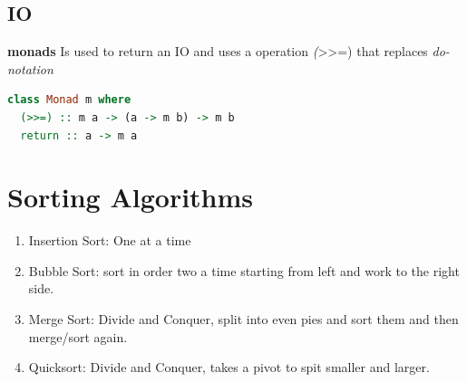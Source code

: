 \subsection{IO}
\textbf{monads}
Is used to return an IO and uses a operation \emph(>>=) that replaces \emph{do-notation}
\begin{lstlisting}[language=Haskell]
class Monad m where
  (>>=) :: m a -> (a -> m b) -> m b
  return :: a -> m a
\end{lstlisting}



\section{Sorting Algorithms}
\begin{enumerate}
\item Insertion Sort: One at a time
\item Bubble Sort: sort in order two a time starting from left and work to the right side.
\item Merge Sort: Divide and Conquer, split into even pies and sort them and then merge/sort again. 
\item Quicksort: Divide and Conquer, takes a pivot to spit smaller and larger.
\end{enumerate}



